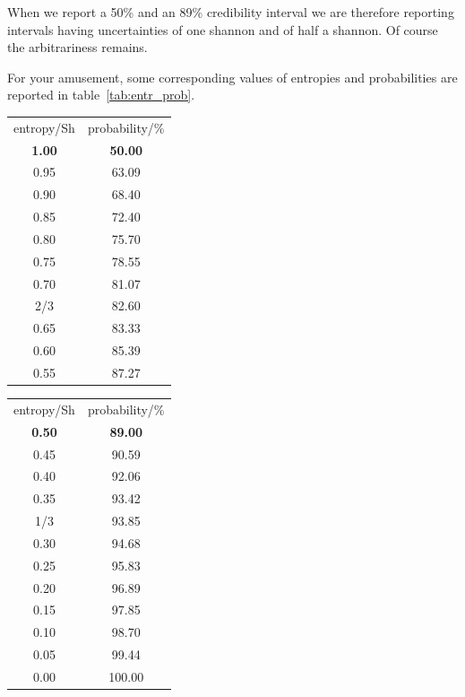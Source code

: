 \documentclass[a4paper,12pt,%
onecolumn,oneside,article,%
british%
]{memoir}
\renewcommand*{\|}[1][]{\nonscript\:#1\vert\nonscript\:\mathopen{}}
\begin{document}
When we report a 50\% and an 89\% credibility interval we are therefore reporting intervals having uncertainties of one shannon and of half a shannon. Of course the arbitrariness remains.

For your amusement, some corresponding values of entropies and probabilities are reported in table~\ref{tab:entr_prob}.


\begin{table}
  \centering\footnotesize
  \begin{minipage}{0.49\linewidth}
    \begin{tabular}{cc}
      entropy/\unit{Sh} & probability/\%
      \\[1ex]
\bfseries 1.00 &\bfseries 50.00 \\
0.95 &  63.09 \\
0.90 &  68.40 \\
0.85 &  72.40 \\
0.80 &  75.70 \\
0.75 &  78.55 \\
0.70 &  81.07 \\
 2/3 &  82.60 \\
0.65 &  83.33 \\
0.60 &  85.39 \\
0.55 &  87.27
    \end{tabular}
  \end{minipage}
  \begin{minipage}{0.49\linewidth}
    \begin{tabular}{cc}
      entropy/\unit{Sh} & probability/\%
      \\[1ex]
\bfseries 0.50 &\bfseries 89.00 \\
0.45 &  90.59 \\
0.40 &  92.06 \\
0.35 &  93.42 \\
 1/3 &  93.85 \\
0.30 &  94.68 \\
0.25 &  95.83 \\
0.20 &  96.89 \\
0.15 &  97.85 \\
0.10 &  98.70 \\
0.05 &  99.44 \\
0.00 & 100.00
    \end{tabular}
  \end{minipage}


\end{table}
\end{document}
